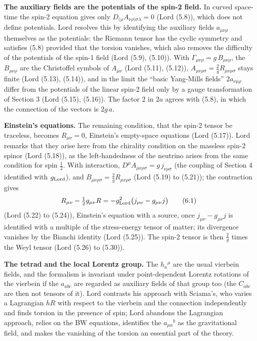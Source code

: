 \documentclass[
  10pt,
]{article}
\begin{document}
\textbf{The auxiliary fields are the potentials of the spin-2 field.} In
curved space-time the spin-2 equation gives only
\(D_{(\mu}A_{\nu\rho)\sigma\lambda}=0\) (Lord (5.8)), which does not
define potentials. Lord resolves this by identifying the auxiliary
fields \(a_{\mu\nu\rho}\) themselves as the potentials: the Riemann
tensor has the cyclic symmetry and satisfies (5.8) provided that the
torsion vanishes, which also removes the difficulty of the potentials of
the spin-1 field (Lord (5.9), (5.10)). With
\(\Gamma_{\mu\nu\rho}=g\,B_{\mu\nu\rho}\), the \(B_{\mu\nu\rho}\) are
the Christoffel symbols of \(A_{\mu\nu}\) (Lord (5.11), (5.12)),
\(A_{\mu\nu\rho\sigma}=\tfrac2gR_{\mu\nu\rho\sigma}\) stays finite (Lord
(5.13), (5.14)), and in the limit the ``basic Yang-Mills fields''
\(2a_{\nu\mu\rho}\) differ from the potentials of the linear spin-2
field only by a gauge transformation of Section 3 (Lord (5.15), (5.16)).
The factor 2 in \(2a\) agrees with (5.8), in which the connection of the
vectors is \(2g\,a\).

\textbf{Einstein's equations.} The remaining condition, that the spin-2
tensor be traceless, becomes \(R_{\mu\nu}=0\), Einstein's empty-space
equations (Lord (5.17)). Lord remarks that they arise here from the
chirality condition on the massless spin-2 spinor (Lord (5.18)), as the
left-handedness of the neutrino arises from the same condition for spin
\(\tfrac12\). With interaction,
\(D^\mu A_{\mu\nu\rho\sigma}=g\,j_{\nu\rho\sigma}\) (the coupling of
Section 4 identified with \(g_{\rm Lord}\)), and
\(B_{\mu\nu\rho\sigma}=\tfrac2gR_{\mu\nu\rho\sigma}\) (Lord (5.19) to
(5.21)); the contraction gives
\[R_{\mu\nu}-\tfrac12g_{\mu\nu}R=-g_{\rm Lord}^2\big(j_{\mu\nu}-g_{\mu\nu}j\big)\tag{6.1}\]
(Lord (5.22) to (5.24)), Einstein's equation with a source, once
\(j_{\mu\nu}-g_{\mu\nu}j\) is identified with a multiple of the
stress-energy tensor of matter; its divergence vanishes by the Bianchi
identity (Lord (5.25)). The spin-2 tensor is then \(\tfrac2g\) times the
Weyl tensor (Lord (5.26) to (5.30)).

\textbf{The tetrad and the local Lorentz group.} The \(h_a{}^\mu\) are
the usual vierbein fields, and the formalism is invariant under
point-dependent Lorentz rotations of the vierbein if the \(a_{abc}\) are
regarded as auxiliary fields of that group too (the \(C_{abc}\) are then
not tensors of it). Lord contrasts his approach with Sciama's, who
varies a Lagrangian \(hR\) with respect to the vierbein and the
connection independently and finds torsion in the presence of spin; Lord
abandons the Lagrangian approach, relies on the BW equations, identifies
the \(a_{\mu a}{}^b\) as the gravitational field, and makes the
vanishing of the torsion an essential part of the theory.
\end{document}
